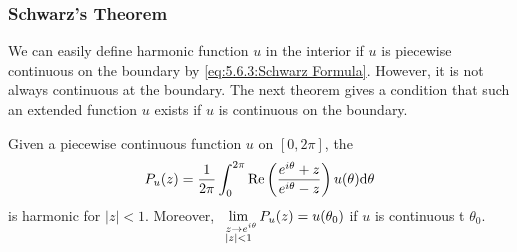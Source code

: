 \subsubsection{Schwarz's Theorem}
We can easily define harmonic function $ u $ in the interior if  $ u  $ is piecewise continuous on the boundary by \eqref{eq:5.6.3:Schwarz Formula}. However, it is not always continuous at the boundary. The next theorem gives a condition that such an extended function $ u $ exists if  $ u  $ is continuous on the boundary.  
\begin{theorem}\label{thm:5.6.4:Schwarz's theorem}
    Given a piecewise continuous function  $ u  $ on  $ [0,2\pi] $, the 
    \begin{equation}
        P_u(z)=\frac{1}{2\pi }\int_0^{2\pi}\mathrm{Re}\left(\frac{e^{i\theta}+z}{e^{i\theta}-z}\right)u(\theta)\mathrm{d}\theta
    \end{equation} 
    is harmonic for  $ |z|<1 $. Moreover,  $ \displaystyle\lim_{\substack{\,\,\,z\to e^{i\theta}\\|z|<1}} P_u(z)=u(\theta_0)$  if  $ u $ is continuous t  $ \theta_0 $.   
\end{theorem}
